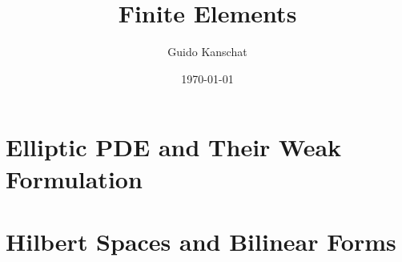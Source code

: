 \documentclass[USEnglish,ignorenonframetext,notheorems,aspectratio=1610]{beamer}
\title{Finite Elements}
\author{Guido Kanschat}
\date{\today}
\begin{document}
\frame{\maketitle}
\section{Elliptic PDE and Their Weak Formulation}


\frame {}
\frame {}
\frame {}

\section{Hilbert Spaces and Bilinear Forms}

\end{document}
